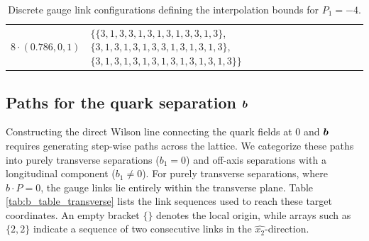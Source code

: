 \begin{table}[tb]
\begin{ruledtabular}
\begin{tabular}{ll}
$8\cdot(0.786,0,1)$ & \parbox[t]{0.72\textwidth}{\raggedright $\{$\mbox{$\{3,1,3,3,1,3,1,3,1,3,3,1,3\}$}, \mbox{$\{3,1,3,1,3,1,3,3,1,3,1,3,1,3\}$}, \mbox{$\{3,1,3,1,3,1,3,1,3,1,3,1,3,1,3\}$}$\}$} \\
$9\cdot(0.786,0,1)$ & \parbox[t]{0.72\textwidth}{\raggedright $\{$\mbox{$\{3,1,3,1,3,3,1,3,1,3,3,1,3,1,3\}$}, \mbox{$\{3,1,3,1,3,1,3,1,3,3,1,3,1,3,1,3\}$}, \mbox{$\{3,1,3,1,3,1,3,3,1,3,1,3,1,3,1,3\}$}, \mbox{$\{3,1,3,1,3,1,3,1,3,1,3,1,3,1,3,1,3\}$}$\}$} \\
$10\cdot(0.786,0,1)$ & \parbox[t]{0.72\textwidth}{\raggedright $\{$\mbox{$\{3,1,3,1,3,3,1,3,1,3,1,3,3,1,3,1,3\}$}, \mbox{$\{3,1,3,1,3,1,3,1,3,3,1,3,1,3,1,3,1,3\}$}, \mbox{$\{3,1,3,1,3,1,3,1,3,1,3,1,3,1,3,1,3,1,3\}$}$\}$} \\
\end{tabular}
\end{ruledtabular}
        \caption{Discrete gauge link configurations defining the interpolation bounds for $P_1 = -4$.}
        \label{tab:eta_table_P-4}
\end{table}

\subsection{Paths for the quark separation \texorpdfstring{$\boldsymbol{b}$}{b}}
\label{sec:b_gauge_links}
Constructing the direct Wilson line connecting the quark fields at $0$ and $\boldsymbol{b}$ requires generating step-wise paths across the lattice. We categorize these paths into purely transverse separations ($b_1 = 0$) and off-axis separations with a longitudinal component ($b_1 \neq 0$). For purely transverse separations, where $b \cdot P = 0$, the gauge links lie entirely within the transverse plane. Table \ref{tab:b_table_transverse} lists the link sequences used to reach these target coordinates. An empty bracket $\{\}$ denotes the local origin, while arrays such as $\{2,2\}$ indicate a sequence of two consecutive links in the $\hat{x_{2}}$-direction.


